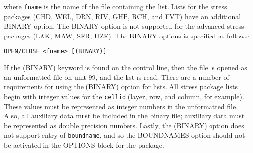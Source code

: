 \noindent where \texttt{fname} is the name of the file containing the list.  Lists for the stress packages (CHD, WEL, DRN, RIV, GHB, RCH, and EVT) have an additional BINARY option.  The BINARY  option is not supported for the advanced stress packages (LAK, MAW, SFR, UZF).  The BINARY options is specified as follows:

\begin{lstlisting}[style=blockdefinition]
  OPEN/CLOSE <fname> [(BINARY)]
\end{lstlisting}

If the (BINARY) keyword is found on the control line, then the file is opened as an unformatted file on unit 99, and the list is read.  There are a number of requirements for using the (BINARY) option for lists.  All stress package lists begin with integer values for the \texttt{cellid} (layer, row, and column, for example).  These values must be represented as integer numbers in the unformatted file.  Also, all auxiliary data must be included in the binary file; auxiliary data must be represented as double precision numbers.  Lastly, the (BINARY) option does not support entry of \texttt{boundname}, and so the BOUNDNAMES option should not be activated in the OPTIONS block for the package.  